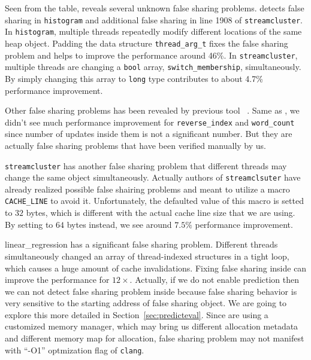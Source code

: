 Seen from the table,  reveals several unknown false sharing problems.  detects 
false sharing in \texttt{histogram} and additional false sharing in line 1908 of
\texttt{streamcluster}. 
In \texttt{histogram}, multiple threads repeatedly modify different locations of the same heap object. 
Padding the data structure \texttt{thread\_arg\_t} fixes the false sharing problem and 
helps to improve the performance around 46\%.
In \texttt{streamcluster}, multiple threads are changing a \texttt{bool} array, \texttt{switch\_membership}, simultaneously. By simply changing this array to \texttt{long} type contributes to about 4.7\% performance improvement. 

Other false sharing problems has been revealed by previous tool \sheriff{}~\cite{sheriff}. 
Same as \sheriff{}, we didn't see much performance improvement for \texttt{reverse\_index} and 
\texttt{word\_count} since number of updates inside them is not a significant number. But they
are actually false sharing problems that have been verified manually by us.

\texttt{streamcluster} has another false sharing problem that different threads 
may change the same object simultaneously. 
Actually authors of \texttt{streamclsuter} have already realized possible
false shairing problems and meant to utilize a macro \texttt{CACHE\_LINE} to avoid it. Unfortunately,
the defaulted value of this macro is setted to $32$ bytes, which is different with the actual
cache line size that we are using. By setting to $64$ bytes instead, we see around $7.5\%$ performance
improvement.

linear\_regression has a significant false sharing problem. 
Different threads simultaneously changed an array of thread-indexed structures in a tight
loop, which causes a huge amount of cache invalidations. 
Fixing false sharing inside can improve the performance for $12\times$. 
Actually, if we do not enable prediction then 
we can not detect false sharing problem inside because false sharing behavior is 
very sensitive to the starting address of false sharing object. 
We are going to explore this more detailed in Section~\ref{sec:predicteval}.
Since  are using a customized memory manager, which may
bring us different allocation metadata and different memory map for allocation,
false sharing problem may not manifest with ``-O1'' optmization flag of \texttt{clang}.

